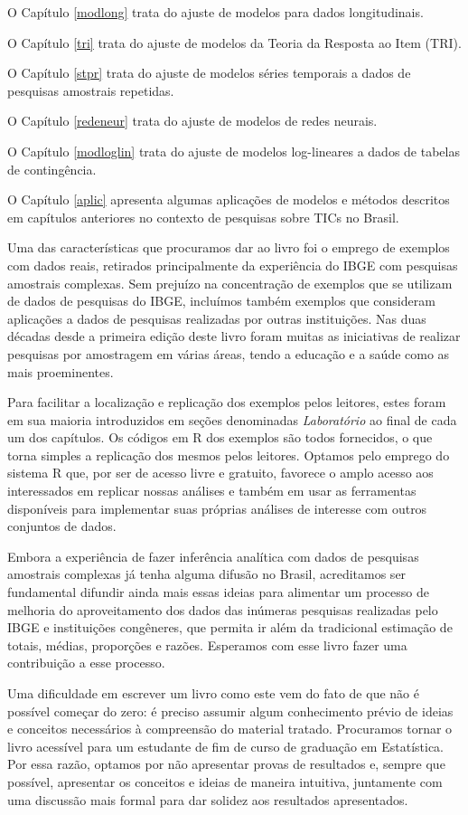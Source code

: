 \documentclass[
  12pt,
  brazilian,
]{book}
\theoremstyle{definition}
\theoremstyle{definition}
\theoremstyle{definition}
\theoremstyle{definition}
\theoremstyle{remark}
\begin{document}
O Capítulo \ref{modlong} trata do ajuste de modelos para dados longitudinais.

O Capítulo \ref{tri} trata do ajuste de modelos da Teoria da Resposta ao Item (TRI).

O Capítulo \ref{stpr} trata do ajuste de modelos séries temporais a dados de pesquisas amostrais repetidas.

O Capítulo \ref{redeneur} trata do ajuste de modelos de redes neurais.

O Capítulo \ref{modloglin} trata do ajuste de modelos log-lineares a dados de tabelas de contingência.

O Capítulo \ref{aplic} apresenta algumas aplicações de modelos e métodos descritos em capítulos anteriores no contexto de pesquisas sobre TICs no Brasil.

Uma das características que procuramos dar ao livro foi o emprego de exemplos com dados reais, retirados principalmente da experiência do IBGE com pesquisas amostrais complexas. Sem prejuízo na concentração de exemplos que se utilizam de dados de pesquisas do IBGE, incluímos também exemplos que consideram aplicações a dados de pesquisas realizadas por outras instituições. Nas duas décadas desde a primeira edição deste livro foram muitas as iniciativas de realizar pesquisas por amostragem em várias áreas, tendo a educação e a saúde como as mais proeminentes.

Para facilitar a localização e replicação dos exemplos pelos leitores, estes foram em sua maioria introduzidos em seções denominadas \emph{Laboratório} ao final de cada um dos capítulos. Os códigos em R dos exemplos são todos fornecidos, o que torna simples a replicação dos mesmos pelos leitores. Optamos pelo emprego do sistema R que, por ser de acesso livre e gratuito, favorece o amplo acesso aos interessados em replicar nossas análises e também em usar as ferramentas disponíveis para implementar suas próprias análises de interesse com outros conjuntos de dados.

Embora a experiência de fazer inferência analítica com dados de pesquisas amostrais complexas já tenha alguma difusão no Brasil, acreditamos ser fundamental difundir ainda mais essas ideias para alimentar um processo de melhoria do aproveitamento dos dados das inúmeras pesquisas realizadas pelo IBGE e instituições congêneres, que permita ir além da tradicional estimação de totais, médias, proporções e razões. Esperamos com esse livro fazer uma contribuição a esse processo.

Uma dificuldade em escrever um livro como este vem do fato de que não é possível começar do zero: é preciso assumir algum conhecimento prévio de ideias e conceitos necessários à compreensão do material tratado. Procuramos tornar o livro acessível para um estudante de fim de curso de graduação em Estatística. Por essa razão, optamos por não apresentar provas de resultados e, sempre que possível, apresentar os conceitos e ideias de maneira intuitiva, juntamente com uma discussão mais formal para dar solidez aos resultados apresentados.
\end{document}
